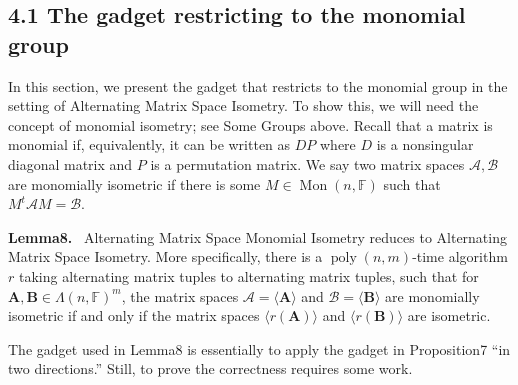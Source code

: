 \documentclass[10pt,a4paper]{article}
\newenvironment{authorclaim}[1]{\par\medskip\noindent\textbf{#1.}\ }{\par\medskip}
\begin{document}
\subsection*{4.1 The gadget restricting to the monomial group}
In this section, we present the gadget that restricts to the monomial group in the setting of Alternating Matrix Space Isometry. To show this, we will need the concept of monomial isometry; see Some Groups above. Recall that a matrix is monomial if, equivalently, it can be written as $DP$ where $D$ is a nonsingular diagonal matrix and $P$ is a permutation matrix. We say two matrix spaces $\mathcal A,\mathcal B$ are monomially isometric if there is some $M\in\operatorname{Mon}(n,\mathbb F)$ such that $M^t\mathcal A M=\mathcal B$.
\begin{authorclaim}{Lemma8}
Alternating Matrix Space Monomial Isometry reduces to Alternating Matrix Space Isometry. More specifically, there is a $\operatorname{poly}(n,m)$-time algorithm $r$ taking alternating matrix tuples to alternating matrix tuples, such that for $\mathbf A,\mathbf B\in\Lambda(n,\mathbb F)^m$, the matrix spaces $\mathcal A=\langle\mathbf A\rangle$ and $\mathcal B=\langle\mathbf B\rangle$ are monomially isometric if and only if the matrix spaces $\langle r(\mathbf A)\rangle$ and $\langle r(\mathbf B)\rangle$ are isometric.
\end{authorclaim}
The gadget used in Lemma8 is essentially to apply the gadget in Proposition7 ``in two directions.'' Still, to prove the correctness requires some work.
\end{document}
